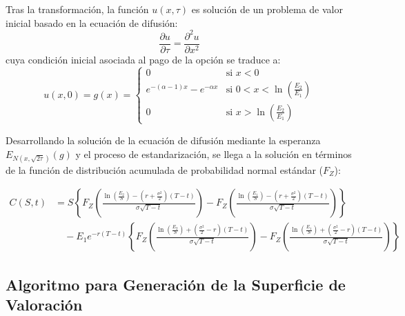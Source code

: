 \documentclass[12pt]{article}
\begin{document}
Tras la transformación, la función $u(x, \tau)$ es solución de un problema de valor inicial basado en la ecuación de difusión:
\begin{equation}
\frac{\partial u}{\partial \tau} = \frac{\partial^2 u}{\partial x^2}
\end{equation}
cuya condición inicial asociada al pago de la opción se traduce a:
\begin{equation}
u(x, 0) = g(x) = 
\begin{cases} 
0 & \text{si } x < 0 \\ 
e^{-(\alpha-1)x} - e^{-\alpha x} & \text{si } 0 < x < \ln\left(\frac{E_2}{E_1}\right) \\ 
0 & \text{si } x > \ln\left(\frac{E_2}{E_1}\right) 
\end{cases}
\end{equation}

Desarrollando la solución de la ecuación de difusión mediante la esperanza $E_{N(x, \sqrt{2\tau})}(g)$ y el proceso de estandarización, se llega a la solución en términos de la función de distribución acumulada de probabilidad normal estándar ($F_Z$):

\begin{equation}
\begin{split}
C(S, t) &= S \left\{ F_Z \left( \frac{\ln\left(\frac{E_2}{S}\right) - \left(r + \frac{\sigma^2}{2}\right)(T - t)}{\sigma\sqrt{T - t}} \right) - F_Z \left( \frac{\ln\left(\frac{E_1}{S}\right) - \left(r + \frac{\sigma^2}{2}\right)(T - t)}{\sigma\sqrt{T - t}} \right) \right\} \\
&\quad - E_1 e^{-r(T-t)} \left\{ F_Z \left( \frac{\ln\left(\frac{E_2}{S}\right) + \left(\frac{\sigma^2}{2} - r\right)(T - t)}{\sigma\sqrt{T - t}} \right) - F_Z \left( \frac{\ln\left(\frac{E_1}{S}\right) + \left(\frac{\sigma^2}{2} - r\right)(T - t)}{\sigma\sqrt{T - t}} \right) \right\}
\end{split}
\end{equation}

\subsection{Algoritmo para Generación de la Superficie de Valoración}
\end{document}
